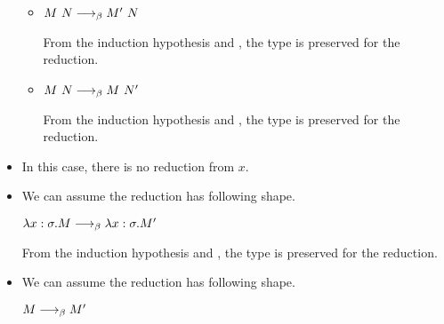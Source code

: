 \begin{itemize}
\begin{itemize}
	      	\item $M\ N \longrightarrow_{\beta} M'\ N$
	      	      	      	      	      	      	      	      	      	      	      	      		      	      	      	      	      	      	      	      	      	      
	      	      From the induction hypothesis and \TApp, the type is preserved for the reduction.
	      	\item $M\ N \longrightarrow_{\beta} M\ N'$
	      	      	      	      	      	      	      	      	      	      	      	      		      	      	      	      	      	      	      	      	      	      
	      	      From the induction hypothesis and \TApp, the type is preserved for the reduction.
	      \end{itemize}
	      	      	      	      	      	      		      	      	      	      	      
	      \iffullversion
	      	      	      	      	      	      		      	      	      	      	      
	\item \TVar
	      	      	      	      	      	      		      	      	      	      	      
	      In this case, there is no reduction from $x$.
	      	      	      	      	      	      		      	      	      	      	      
	\item \TAbs
	      	      	      	      	      	      		      	      	      	      	      
	      We can assume the reduction has following shape.
	      	      	      	      	      	      		      	      	      	      	      
	      $\lambda x:\sigma.M \longrightarrow_{\beta} \lambda x:\sigma.M'$
	      	      	      	      	      	      		      	      	      	      	      
	      From the induction hypothesis and \TAbs, the type is preserved for the reduction.
	      	      	      	      	      	      		      	      	      	      	      
	      	      	      	      	      	      		      	      	      	      	      
	\item \TConv
	      	      	      	      	      	      		      	      	      	      	      
	      We can assume the reduction has following shape.
	      	      	      	      	      	      		      	      	      	      	      
	      $M \longrightarrow_{\beta} M'$
	      	      	      	      	      	      		      	      	      	      	      

\end{itemize}
